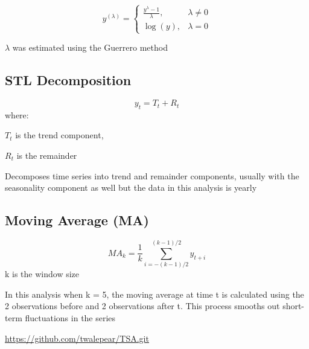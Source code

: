 \documentclass[
]{article}
\begin{document}
\[
y^{(\lambda)} =
\begin{cases}
\frac{y^\lambda - 1}{\lambda}, & \lambda \ne 0 \\
\log(y), & \lambda = 0
\end{cases}
\]

\(\lambda\) was estimated using the Guerrero method

\subsection{STL Decomposition}\label{stl-decomposition}

\[
y_t = T_t + R_t
\] where:

\(T_t\) is the trend component,

\(R_t\) is the remainder

Decomposes time series into trend and remainder components, usually with
the seasonality component as well but the data in this analysis is
yearly

\subsection{Moving Average (MA)}\label{moving-average-ma}

\[
MA_k = \frac{1}{k} \sum_{i=-(k-1)/2}^{(k-1)/2} y_{t+i}
\] k is the window size

In this analysis when k = 5, the moving average at time t is calculated
using the 2 observations before and 2 observations after t. This process
smooths out short-term fluctuations in the series

\url{https://github.com/twalepear/TSA.git}
\end{document}
